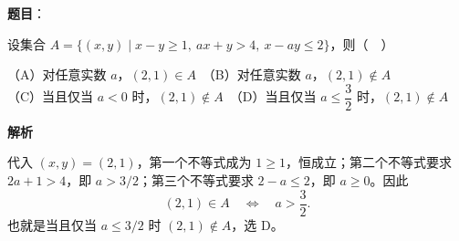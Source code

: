 \begin{answer}

\textbf{题目}：

设集合 $A=\{(x,y)\mid x-y\geqslant1,\ ax+y>4,\ x-ay\leqslant2\}$，则（　）

（A）对任意实数 $a$，$(2,1)\in A$　（B）对任意实数 $a$，$(2,1)\notin A$\\
（C）当且仅当 $a<0$ 时，$(2,1)\notin A$　（D）当且仅当 $a\leqslant\dfrac32$ 时，$(2,1)\notin A$

\textbf{解析}

代入 $(x,y)=(2,1)$，第一个不等式成为 $1\geqslant1$，恒成立；第二个不等式要求 $2a+1>4$，即 $a>3/2$；第三个不等式要求 $2-a\leqslant2$，即 $a\geqslant0$。因此
\nopagebreak[4]
\[
(2,1)\in A\quad\Longleftrightarrow\quad a>\frac32.
\]
也就是当且仅当 $a\leqslant3/2$ 时 $(2,1)\notin A$，选 D。


\end{answer}

